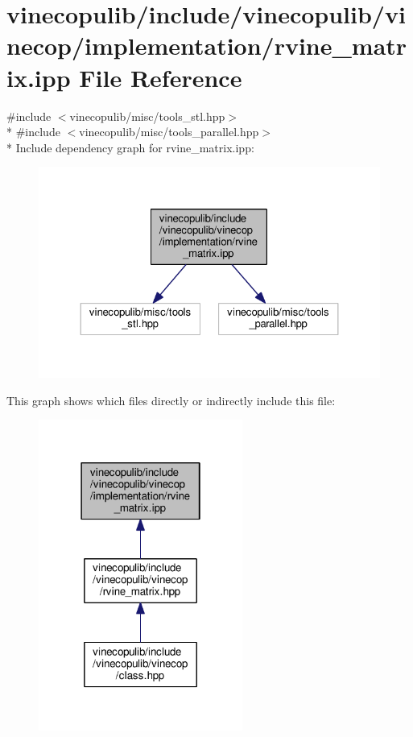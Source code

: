 \hypertarget{rvine__matrix_8ipp}{}\section{vinecopulib/include/vinecopulib/vinecop/implementation/rvine\+\_\+matrix.ipp File Reference}
\label{rvine__matrix_8ipp}
{\ttfamily \#include $<$vinecopulib/misc/tools\+\_\+stl.\+hpp$>$}\\*
{\ttfamily \#include $<$vinecopulib/misc/tools\+\_\+parallel.\+hpp$>$}\\*
Include dependency graph for rvine\+\_\+matrix.\+ipp\+:\nopagebreak
\begin{figure}[H]
\begin{center}
\leavevmode
\includegraphics[width=324pt]{rvine__matrix_8ipp__incl}
\end{center}
\end{figure}
This graph shows which files directly or indirectly include this file\+:\nopagebreak
\begin{figure}[H]
\begin{center}
\leavevmode
\includegraphics[width=190pt]{rvine__matrix_8ipp__dep__incl}
\end{center}
\end{figure}
